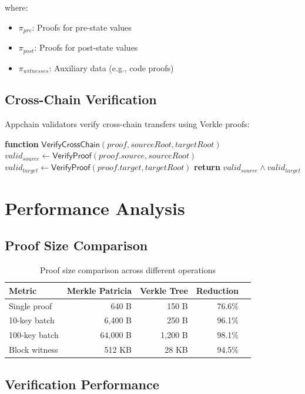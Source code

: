 \documentclass[11pt,a4paper]{article}
\theoremstyle{definition}
\begin{document}
where:
\begin{itemize}
    \item $\pi_{pre}$: Proofs for pre-state values
    \item $\pi_{post}$: Proofs for post-state values
    \item $\pi_{witnesses}$: Auxiliary data (e.g., code proofs)
\end{itemize}

\subsection{Cross-Chain Verification}

Appchain validators verify cross-chain transfers using Verkle proofs:

\begin{algorithmic}[1]
\STATE \textbf{function} $\mathsf{VerifyCrossChain}(proof, sourceRoot, targetRoot)$
\STATE $valid_{source} \gets \mathsf{VerifyProof}(proof.source, sourceRoot)$
\STATE $valid_{target} \gets \mathsf{VerifyProof}(proof.target, targetRoot)$
\STATE \textbf{return} $valid_{source} \land valid_{target}$
\end{algorithmic}

\section{Performance Analysis}

\subsection{Proof Size Comparison}

\begin{table}[H]
\centering
\begin{tabular}{@{}lrrrr@{}}
\toprule
\textbf{Metric} & \textbf{Merkle Patricia} & \textbf{Verkle Tree} & \textbf{Reduction} \\
\midrule
Single proof & 640 B & 150 B & 76.6\% \\
10-key batch & 6,400 B & 250 B & 96.1\% \\
100-key batch & 64,000 B & 1,200 B & 98.1\% \\
Block witness & 512 KB & 28 KB & 94.5\% \\
\bottomrule
\end{tabular}
\caption{Proof size comparison across different operations}
\label{tab:proof-sizes}
\end{table}

\subsection{Verification Performance}
\end{document}
